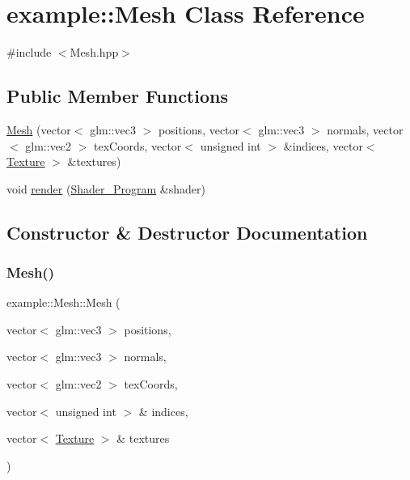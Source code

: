 \hypertarget{classexample_1_1_mesh}{}\section{example\+:\+:Mesh Class Reference}
\label{classexample_1_1_mesh}


{\ttfamily \#include $<$Mesh.\+hpp$>$}

\subsection*{Public Member Functions}
\begin{DoxyCompactItemize}
\item 
\mbox{\hyperlink{classexample_1_1_mesh_ad6e8e007a6952b2194fd1a91e1e69bbd}{Mesh}} (vector$<$ glm\+::vec3 $>$ positions, vector$<$ glm\+::vec3 $>$ normals, vector$<$ glm\+::vec2 $>$ tex\+Coords, vector$<$ unsigned int $>$ \&indices, vector$<$ \mbox{\hyperlink{namespaceexample_a4e4424d0fb5b457e8c00b8a7cdaad0e6}{Texture}} $>$ \&textures)
\item 
void \mbox{\hyperlink{classexample_1_1_mesh_ac3296f2f3fcca99f6282a601a5535678}{render}} (\mbox{\hyperlink{classexample_1_1_shader___program}{Shader\+\_\+\+Program}} \&shader)
\end{DoxyCompactItemize}


\subsection{Constructor \& Destructor Documentation}
\mbox{\label{classexample_1_1_mesh_ad6e8e007a6952b2194fd1a91e1e69bbd}} 
\subsubsection{\texorpdfstring{Mesh()}{Mesh()}}
{\footnotesize\ttfamily example\+::\+Mesh\+::\+Mesh (\begin{DoxyParamCaption}\item[{vector$<$ glm\+::vec3 $>$}]{positions,  }\item[{vector$<$ glm\+::vec3 $>$}]{normals,  }\item[{vector$<$ glm\+::vec2 $>$}]{tex\+Coords,  }\item[{vector$<$ unsigned int $>$ \&}]{indices,  }\item[{vector$<$ \mbox{\hyperlink{namespaceexample_a4e4424d0fb5b457e8c00b8a7cdaad0e6}{Texture}} $>$ \&}]{textures }\end{DoxyParamCaption})}



